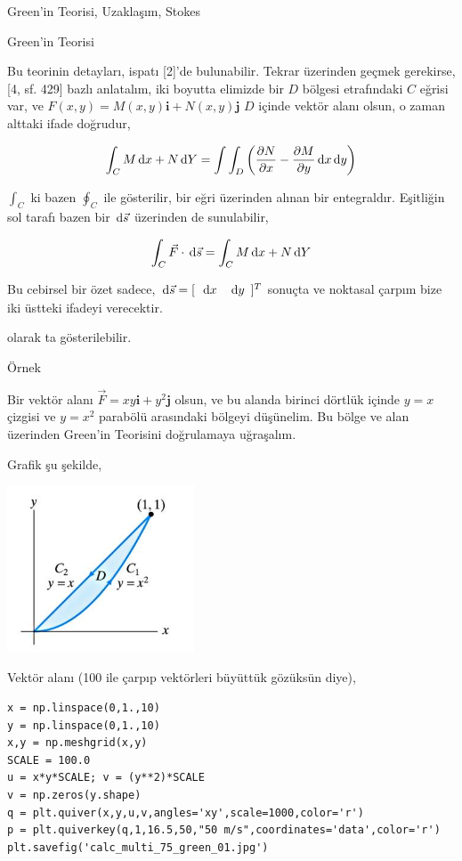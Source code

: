 \documentclass[12pt,fleqn]{article}\usepackage{../../common}
\begin{document}
Green'in Teorisi, Uzaklaşım, Stokes

Green'in Teorisi

Bu teorinin detayları, ispatı [2]'de bulunabilir. Tekrar üzerinden geçmek
gerekirse, [4, sf. 429] bazlı anlatalım, iki boyutta elimizde bir $D$ bölgesi
etrafındaki $C$ eğrisi var, ve $F(x,y) = M(x,y) \textbf{i} + N(x,y) \textbf{j}$
$D$ içinde vektör alanı olsun, o zaman alttaki ifade doğrudur,

$$
\int_C M \,\mathrm{d} x + N \,\mathrm{d} Y =
\int \int_D \left(
  \frac{\partial N}{\partial x} - \frac{\partial M}{\partial y}
  \,\mathrm{d} x \,\mathrm{d} y
\right)
$$

$\int_C$ ki bazen $\oint_C$ ile gösterilir, bir eğri üzerinden alınan bir
entegraldır. Eşitliğin sol tarafı bazen bir $\,\mathrm{d}\vec{s}$ üzerinden de
sunulabilir,

$$
\int_C \vec{F} \cdot \,\mathrm{d}\vec{s} = \int_C M \,\mathrm{d} x + N \,\mathrm{d} Y 
$$

Bu cebirsel bir özet sadece, $\,\mathrm{d}{\vec{s}} = [\begin{array}{cc} \,\mathrm{d} x & \,\mathrm{d} y \end{array}]^T$
sonuçta ve noktasal çarpım bize iki üstteki ifadeyi verecektir.

olarak ta gösterilebilir.

Örnek

Bir vektör alanı $\vec{F} = xy \textbf{i} + y^2 \textbf{j}$ olsun, ve bu alanda
birinci dörtlük içinde $y = x$ çizgisi ve $y=x^2$ parabölü arasındaki bölgeyi
düşünelim. Bu bölge ve alan üzerinden Green'in Teorisini doğrulamaya uğraşalım.

Grafik şu şekilde,

\includegraphics[width=15em]{calc_multi_75_green_02.jpg}

Vektör alanı (100 ile çarpıp vektörleri büyüttük gözüksün diye),

\begin{verbatim}
x = np.linspace(0,1.,10)
y = np.linspace(0,1.,10)
x,y = np.meshgrid(x,y)
SCALE = 100.0
u = x*y*SCALE; v = (y**2)*SCALE
v = np.zeros(y.shape)
q = plt.quiver(x,y,u,v,angles='xy',scale=1000,color='r')
p = plt.quiverkey(q,1,16.5,50,"50 m/s",coordinates='data',color='r')
plt.savefig('calc_multi_75_green_01.jpg')
\end{verbatim}
\end{document}
